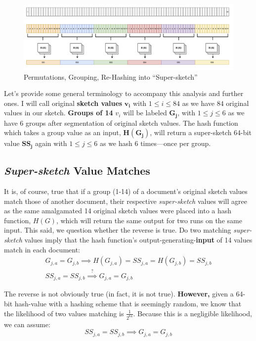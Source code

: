 \documentclass[conference]{styles/acmsiggraph}
\newcommand{\?}{\stackrel{?}{=}}
\begin{document}
\begin{figure}[h!]
    \centering
    \includegraphics[width=1\textwidth]{Problem3Figs/3image.png}
    \caption{Permutations, Grouping, Re-Hashing into \enquote{Super-sketch}}
    \label{fig:similarity}
\end{figure}
\FloatBarrier

Let's provide some general terminology to accompany this analysis and further ones.  I will call original \textbf{sketch values} $\boxed{\mathbf{v_i}}$ with $1 \leq i \leq 84$ as we have $84$ original values in our sketch.  \textbf{Groups of 14} $v_i$ will be labeled $\boxed{\mathbf{G_j}}$, with $1 \leq j \leq 6$ as we have $6$ groups after segmentation of original sketch values.  The hash function which takes a group value as an input, $\boxed{\mathbf{H(G_j)}}$, will return a super-sketch 64-bit value $\boxed{\mathbf{SS_j}}$ again with $1 \leq j \leq 6$ as we hash $6$ times---once per group.

\subsection{\textit{Super-sketch} Value Matches} \label{section:ssmatch}
It is, of course, true that if a group (1-14) of a document's original sketch values match those of another document, their respective \textit{super-sketch} values will agree as the same amalgamated 14 original sketch values were placed into a hash function, $H(G)$, which will return the same output for two runs on the same input.  This said, we question whether the reverse is true.  Do two matching \textit{super-sketch} values imply that the hash function's output-generating-\textbf{input} of 14 values match in each document:
\begin{align}
    G_{j,a} = G_{j,b} \implies H(G_{j,a}) = SS_{j,a} = H(G_{j,b}) = SS_{j,b}\\
    SS_{j,a} = SS_{j,b} \overset{?}{\implies} G_{j,a} = G_{j,b}
\end{align}

The reverse is not obviously true (in fact, it is not true).  \textbf{However,} given a 64-bit hash-value with a hashing scheme that is seemingly random, we know that the likelihood of two values matching is $\frac{1}{2^{64}}$.  Because this is a negligible likelihood, we can assume:
$$SS_{j,a} = SS_{j,b} \implies G_{j,a} = G_{j,b}$$
\end{document}
